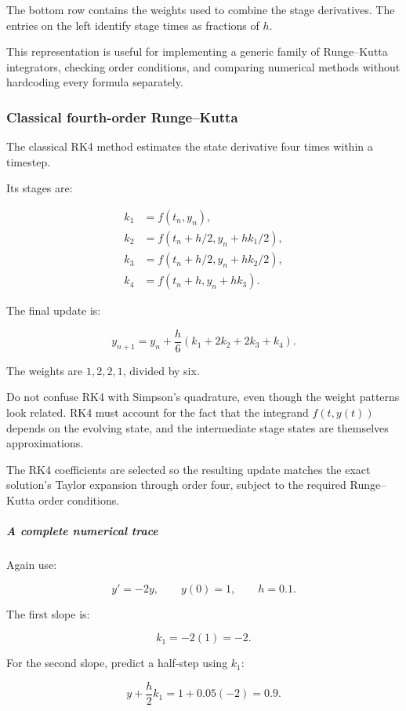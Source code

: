 The bottom row contains the weights used to combine the stage derivatives. The entries on the left identify stage times as fractions of \(h\).

This representation is useful for implementing a generic family of Runge--Kutta integrators, checking order conditions, and comparing numerical methods without hardcoding every formula separately.

\subsubsection{Classical fourth-order Runge--Kutta}\label{02-foundations-ii-ch025-classical-fourth-order-rungekutta}

The classical RK4 method estimates the state derivative four times within a timestep.

Its stages are:

\[
\boxed{ \begin{aligned} k_1&=f(t_n,y_n),\\ k_2&=f(t_n+h/2,y_n+hk_1/2),\\ k_3&=f(t_n+h/2,y_n+hk_2/2),\\ k_4&=f(t_n+h,y_n+hk_3). \end{aligned} }
\]

The final update is:

\[
\boxed{ y_{n+1} = y_n+\frac h6(k_1+2k_2+2k_3+k_4) }.
\]

The weights are \(1,2,2,1\), divided by six.

Do not confuse RK4 with Simpson's quadrature, even though the weight patterns look related. RK4 must account for the fact that the integrand \(f(t,y(t))\) depends on the evolving state, and the intermediate stage states are themselves approximations.

The RK4 coefficients are selected so the resulting update matches the exact solution's Taylor expansion through order four, subject to the required Runge--Kutta order conditions.

\subparagraph{A complete numerical trace}\label{02-foundations-ii-ch025-a-complete-numerical-trace}

Again use:

\[
y'=-2y,\qquad y(0)=1,\qquad h=0.1.
\]

The first slope is:

\[
k_1=-2(1)=-2.
\]

For the second slope, predict a half-step using \(k_1\):

\[
y+\frac h2k_1 = 1+0.05(-2)=0.9.
\]

